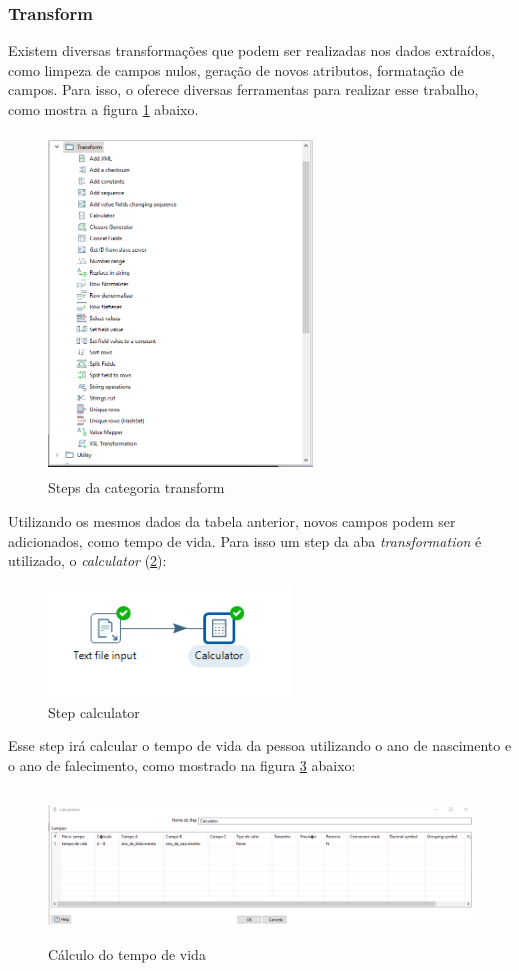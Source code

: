\subsubsection{Transform}
Existem diversas transformações que podem ser realizadas nos dados extraídos, como limpeza de campos nulos, geração de novos atributos, formatação de campos. Para isso, o \pdi oferece diversas ferramentas para realizar esse trabalho, como mostra a figura \ref{transformsteps} abaixo.
\begin{figure}[H]
\centering
\includegraphics[width=7cm, height=9cm]{imagens/transforms.png}
\caption{Steps da categoria transform}
\label{transformsteps}
\end{figure}
Utilizando os mesmos dados da tabela anterior, novos campos podem ser adicionados, como tempo de vida. Para isso um step da aba \textit{transformation} é utilizado, o \textit{calculator} (\ref{calculator}):
\begin{figure}[H]
\centering
\includegraphics[height=3cm]{imagens/calc.png}
\caption{Step calculator}
\label{calculator}
\end{figure}
Esse step irá calcular o tempo de vida da pessoa utilizando o ano de nascimento e o ano de falecimento, como mostrado na figura \ref{timespan} abaixo:
\begin{figure}[H]
\centering
\includegraphics[height=4cm]{imagens/tempovida.png}
\caption{Cálculo do tempo de vida}
\label{timespan}
\end{figure}
